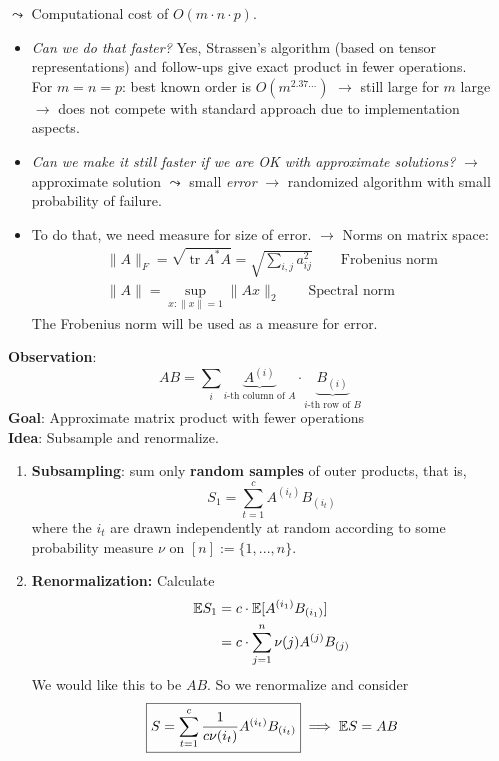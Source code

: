 $\leadsto$ Computational cost of $O(m\cdot n \cdot p).$ 
\begin{itemize}
\item \emph{Can we do that faster?} Yes, Strassen's algorithm (based on tensor representations) and follow-ups give exact product in fewer operations. \\
For $m=n=p$: best known order is $O(m^{2.37...})$ 
	\subitem $\rightarrow$ still large for $m$ large
	\subitem $\rightarrow$ does not compete with standard approach due to implementation aspects.
\item \emph{Can we make it still faster if we are OK with approximate solutions?}
	\subitem $\rightarrow$ approximate solution $\leadsto$ small \emph{error}  
	\subitem $\rightarrow$ randomized algorithm with small probability of failure. 
\item To do that, we need measure for size of error. $\rightarrow$ Norms on matrix space:
\begin{align*}
\|A\|_F = \sqrt{\operatorname{tr}A^*A} = \sqrt{\sum_{i,j} a_{ij}^2}\quad\quad \text{Frobenius norm}\\
\|A\| = \sup_{x:\|x\|=1} \|Ax\|_2 \quad\quad \text{Spectral norm}
\end{align*}
The Frobenius norm will be used as a measure for error.
\end{itemize}
\drawaline
{}
\textbf{Observation}:
\begin{equation*}
AB=\sum_{i} \underbrace{A^{(i)}}_{i\text{-th column of }A} \cdot \underbrace{B_{(i)}}_{i\text{-th row of }B}
\end{equation*}
\textbf{Goal}: Approximate matrix product with fewer operations \\
\textbf{Idea}: Subsample and renormalize.
\begin{enumerate}
	\item \textbf{Subsampling}: sum only \textbf{random samples} of outer products, that is,
	$$S_1 = \sum_{t=1}^c A^{(i_t)}B_{(i_t)}$$
	where the $i_t$ are drawn independently at random according to some probability measure $\nu$ on $[n]:= \{1,...,n\}$. 
	\item \textbf{Renormalization:} Calculate 
	\begin{equation*}
	\begin{split}
		\mathbb{E} S_1 & = c \cdot  \mathbb{E}[A^{(i_1)} B_{(i_1)}]		\\
				& = c \cdot \sum_{j=1}^n \nu(j) A^{(j)} B_{(j)} 
	\end{split}
	\end{equation*}
		We would like this to be $AB$. So we renormalize and consider
	\begin{equation} \label{matrix-mult-random}
		\boxed{S= \sum_{t=1}^c \frac{1}{c\nu(i_t)}A^{(i_t)} B_{(i_t)}} \implies \mathbb{E} S= AB
	\end{equation}
\end{enumerate}

